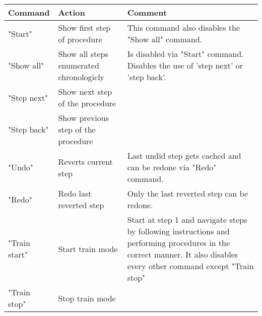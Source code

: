 \begin{center}
    \label{table::VoiceCommands}
    \begin{tabular}{ | l | p{4cm} | p{8cm} |}
    \hline
    Command & Action & Comment \\ \hline
    "Start" & Show first step of procedure & This command also disables the "Show all" command. \\ \hline
    "Show all" & Show all steps enumerated chronologicly & Is disabled via "Start" command. \newline
    Disables the use of 'step next' or 'step back'. \\ \hline
    "Step next" & Show next step of the procedure & \\ \hline
    "Step back" & Show previous step of the procedure & \\ \hline
    "Undo" & Reverts current step & Last undid step gets cached and can be redone via "Redo" command. \\ \hline
    "Redo" & Redo last reverted step & Only the last reverted step can be redone. \\ \hline
    "Train start" & Start train mode & Start at step 1 and navigate steps by following instructions and performing procedures in the correct manner.
    It also disables every other command except "Train stop" \\ \hline
    "Train stop" & Stop train mode & \\ \hline
    \end{tabular}
\end{center}

